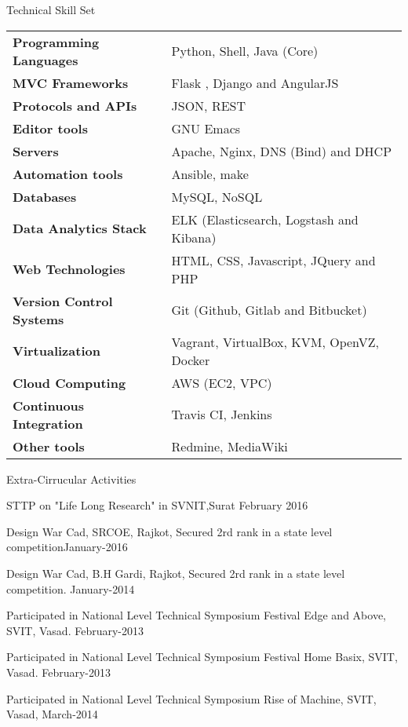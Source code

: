 \documentclass{resume} %
\begin{document}
\begin{rSection}
  {Technical Skill Set}

  \begin{tabular}{ @{} >{\bfseries}l @{\hspace{6ex}} l }
    Programming Languages & Python, Shell, Java (Core) \\
    MVC Frameworks & Flask , Django and AngularJS\\
    Protocols and APIs & JSON, REST \\
    Editor tools & GNU Emacs \\
    Servers & Apache, Nginx, DNS (Bind) and DHCP \\  
    Automation tools & Ansible, make \\
    Databases &  MySQL, NoSQL \\
    Data Analytics Stack & ELK (Elasticsearch, Logstash and Kibana) \\
    Web Technologies & HTML, CSS, Javascript, JQuery and PHP \\
    Version Control Systems & Git (Github, Gitlab and Bitbucket) \\
    Virtualization & Vagrant, VirtualBox, KVM, OpenVZ, Docker \\
    Cloud Computing & AWS (EC2, VPC) \\
    Continuous Integration & Travis CI, Jenkins \\
    Other tools & Redmine, MediaWiki
    
  \end{tabular}

\end{rSection}


\begin{rSection}{Extra-Cirrucular Activities} \itemsep -1pt {}   
\item STTP on "Life Long Research" in SVNIT,Surat \hfill February 2016
\item Design War Cad, SRCOE, Rajkot, Secured 2rd rank in a state level competition\hfill January-2016
\item  Design War Cad, B.H Gardi, Rajkot, Secured 2rd rank in a
state level competition. \hfill January-2014 
\item Participated in National Level Technical Symposium Festival Edge and Above, SVIT, Vasad. \hfill February-2013
\item Participated in National Level Technical Symposium Festival Home Basix, SVIT, Vasad.
 \hfill  February-2013 
\item Participated in National Level Technical Symposium Rise of Machine, SVIT, Vasad,  \hfill March-2014 
 

\end{rSection}
\end{document}
